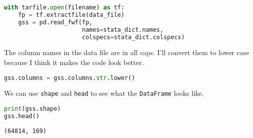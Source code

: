 \begin{lstlisting}[language=Python,style=source]
with tarfile.open(filename) as tf:
    fp = tf.extractfile(data_file)  
    gss = pd.read_fwf(fp,
                      names=stata_dict.names,
                      colspecs=stata_dict.colspecs)
\end{lstlisting}

The column names in the data file are in all caps. I'll convert them to
lower case because I think it makes the code look better.

\begin{lstlisting}[language=Python,style=source]
gss.columns = gss.columns.str.lower()
\end{lstlisting}

We can use \passthrough{\lstinline!shape!} and
\passthrough{\lstinline!head!} to see what the
\passthrough{\lstinline!DataFrame!} looks like.

\begin{lstlisting}[language=Python,style=source]
print(gss.shape)
gss.head()
\end{lstlisting}

\begin{lstlisting}[style=output]
(64814, 169)
\end{lstlisting}

